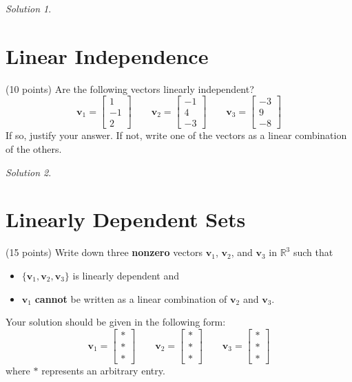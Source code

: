 \documentclass{article}
\theoremstyle{remark}
\newtheorem*{solution}{Solution}
\begin{document}
\begin{solution}
\end{solution}

\pagebreak
\section{Linear Independence}

(10 points) Are the following vectors linearly independent?
\begin{displaymath}
  \mathbf v_1 = \begin{bmatrix}
    1 \\ -1 \\ 2
  \end{bmatrix}
  \qquad
  \mathbf v_2 =
  \begin{bmatrix}
    -1 \\ 4 \\ -3
  \end{bmatrix}
  \qquad
  \mathbf v_3 =
  \begin{bmatrix}
    -3 \\ 9 \\ -8
  \end{bmatrix}
\end{displaymath}
If so, justify your answer. If not, write one of the vectors as a linear combination of the others.
\begin{solution}
\end{solution}

\pagebreak
\section{Linearly Dependent Sets}
(15 points) Write down three \textbf{nonzero} vectors $\mathbf v_1$, $\mathbf v_2$, and $\mathbf v_3$ in $\mathbb R^3$ such that
\begin{itemize}
\item $\{\mathbf v_1, \mathbf v_2, \mathbf v_3\}$ is linearly dependent and
\item $\mathbf v_1$ \textbf{cannot} be written as a linear combination of $\mathbf v_2$ and $\mathbf v_3$.
\end{itemize}
Your solution should be given in the following form:
\begin{displaymath}
  \mathbf v_1 =
  \begin{bmatrix}
    * \\ * \\ *
  \end{bmatrix}
  \qquad
  \mathbf v_2 =
  \begin{bmatrix}
    * \\ * \\ *
  \end{bmatrix}
  \qquad
  \mathbf v_3 =
  \begin{bmatrix}
    * \\ * \\ *
  \end{bmatrix}
\end{displaymath}
where $*$ represents an arbitrary entry.
\end{document}
